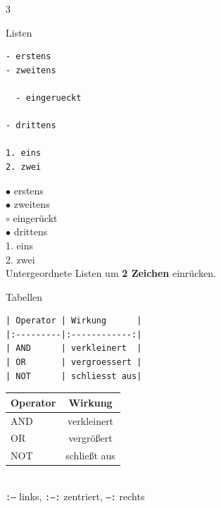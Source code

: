\documentclass[a4paper,landscape,9pt]{extarticle}
\newcommand{\prevtxt}[1]{{\small #1}}
\begin{document}
\begin{multicols}{3}
\begin{mdcard}{Listen}
\begin{lstlisting}[language=lia]
- erstens
- zweitens

  - eingerueckt

- drittens

1. eins
2. zwei
\end{lstlisting}
\tcblower
\prevtxt{%
$\bullet$ erstens\\
$\bullet$ zweitens\\[2pt]
\hspace*{1em}$\circ$ eingerückt\\[2pt]
$\bullet$ drittens\\[3pt]
1. eins\\
2. zwei\\[2pt]
{\scriptsize\color{muted}Untergeordnete Listen um \textbf{2 Zeichen} einrücken.}}
\end{mdcard}


\begin{mdcard}{Tabellen}
\begin{lstlisting}[language=lia]
| Operator | Wirkung      |
|:---------|:------------:|
| AND      | verkleinert  |
| OR       | vergroessert |
| NOT      | schliesst aus|
\end{lstlisting}
\tcblower
\prevtxt{%
\renewcommand{\arraystretch}{1.05}%
\begin{tabular}{|l|c|}\hline
\textbf{Operator} & \textbf{Wirkung}\\\hline
AND & verkleinert\\
OR  & vergrößert\\
NOT & schließt aus\\\hline
\end{tabular}\\[2pt]
{\scriptsize\color{muted}\texttt{:--} links, \texttt{:--:} zentriert, \texttt{--:} rechts}}
\end{mdcard}


\end{multicols}
\end{document}
